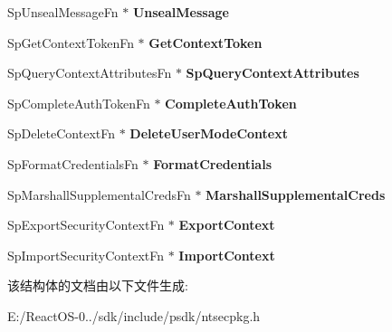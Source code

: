 \begin{DoxyCompactItemize}
Sp\+Unseal\+Message\+Fn $\ast$ {\bfseries Unseal\+Message}
\item 
\mbox{\label{struct_s_e_c_p_k_g___u_s_e_r___f_u_n_c_t_i_o_n___t_a_b_l_e_a69b74c3b48d8db569c8c75650f6407dc}} 
Sp\+Get\+Context\+Token\+Fn $\ast$ {\bfseries Get\+Context\+Token}
\item 
\mbox{\label{struct_s_e_c_p_k_g___u_s_e_r___f_u_n_c_t_i_o_n___t_a_b_l_e_aee91008418c35d3503f5762e32e31329}} 
Sp\+Query\+Context\+Attributes\+Fn $\ast$ {\bfseries Sp\+Query\+Context\+Attributes}
\item 
\mbox{\label{struct_s_e_c_p_k_g___u_s_e_r___f_u_n_c_t_i_o_n___t_a_b_l_e_a39d88c24f4eeba07164c1871533b1019}} 
Sp\+Complete\+Auth\+Token\+Fn $\ast$ {\bfseries Complete\+Auth\+Token}
\item 
\mbox{\label{struct_s_e_c_p_k_g___u_s_e_r___f_u_n_c_t_i_o_n___t_a_b_l_e_a85904a36e916bf820d40192653212f74}} 
Sp\+Delete\+Context\+Fn $\ast$ {\bfseries Delete\+User\+Mode\+Context}
\item 
\mbox{\label{struct_s_e_c_p_k_g___u_s_e_r___f_u_n_c_t_i_o_n___t_a_b_l_e_ac67bcbf1ab9bbd3d88768ef8b4d49ad8}} 
Sp\+Format\+Credentials\+Fn $\ast$ {\bfseries Format\+Credentials}
\item 
\mbox{\label{struct_s_e_c_p_k_g___u_s_e_r___f_u_n_c_t_i_o_n___t_a_b_l_e_a1ab8126a60b8a5e4b3c5e75fab783539}} 
Sp\+Marshall\+Supplemental\+Creds\+Fn $\ast$ {\bfseries Marshall\+Supplemental\+Creds}
\item 
\mbox{\label{struct_s_e_c_p_k_g___u_s_e_r___f_u_n_c_t_i_o_n___t_a_b_l_e_ab231ec331e08f09a1ea2a8bdaf1e1744}} 
Sp\+Export\+Security\+Context\+Fn $\ast$ {\bfseries Export\+Context}
\item 
\mbox{\label{struct_s_e_c_p_k_g___u_s_e_r___f_u_n_c_t_i_o_n___t_a_b_l_e_a6f5369cea7903aa950ab8773bc1d83d6}} 
Sp\+Import\+Security\+Context\+Fn $\ast$ {\bfseries Import\+Context}
\end{DoxyCompactItemize}


该结构体的文档由以下文件生成\+:\begin{DoxyCompactItemize}
\item 
E\+:/\+React\+O\+S-\/0../sdk/include/psdk/ntsecpkg.\+h\end{DoxyCompactItemize}
